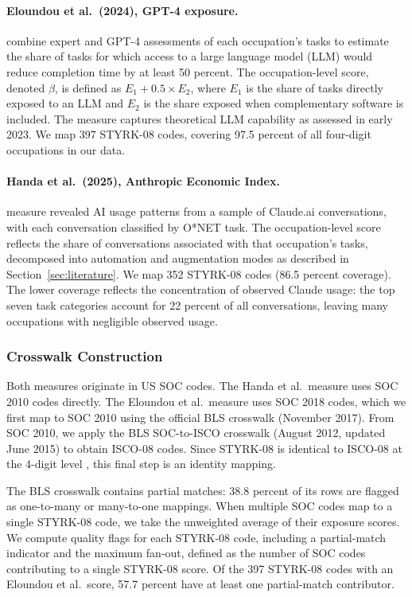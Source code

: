 \paragraph{Eloundou et al.\ (2024), GPT-4 exposure.} \citet{eloundou2024} combine expert and GPT-4 assessments of each occupation's tasks to estimate the share of tasks for which access to a large language model (LLM) would reduce completion time by at least 50 percent. The occupation-level score, denoted $\beta$, is defined as $E_1 + 0.5 \times E_2$, where $E_1$ is the share of tasks directly exposed to an LLM and $E_2$ is the share exposed when complementary software is included. The measure captures theoretical LLM capability as assessed in early 2023. We map 397 STYRK-08 codes, covering 97.5 percent of all four-digit occupations in our data.

\paragraph{Handa et al.\ (2025), Anthropic Economic Index.} \citet{handa2025} measure revealed AI usage patterns from a sample of Claude.ai conversations, with each conversation classified by O*NET task. The occupation-level score reflects the share of conversations associated with that occupation's tasks, decomposed into automation and augmentation modes as described in Section~\ref{sec:literature}. We map 352 STYRK-08 codes (86.5 percent coverage). The lower coverage reflects the concentration of observed Claude usage: the top seven task categories account for 22 percent of all conversations, leaving many occupations with negligible observed usage.

\subsubsection*{Crosswalk Construction}

Both measures originate in US SOC codes. The Handa et al.\ measure uses SOC 2010 codes directly. The Eloundou et al.\ measure uses SOC 2018 codes, which we first map to SOC 2010 using the official BLS crosswalk (November 2017). From SOC 2010, we apply the BLS SOC-to-ISCO crosswalk (August 2012, updated June 2015) to obtain ISCO-08 codes. Since STYRK-08 is identical to ISCO-08 at the 4-digit level \citep{ssb2011styrk}, this final step is an identity mapping.

The BLS crosswalk contains partial matches: 38.8 percent of its rows are flagged as one-to-many or many-to-one mappings. When multiple SOC codes map to a single STYRK-08 code, we take the unweighted average of their exposure scores. We compute quality flags for each STYRK-08 code, including a partial-match indicator and the maximum fan-out, defined as the number of SOC codes contributing to a single STYRK-08 score. Of the 397 STYRK-08 codes with an Eloundou et al.\ score, 57.7 percent have at least one partial-match contributor.


